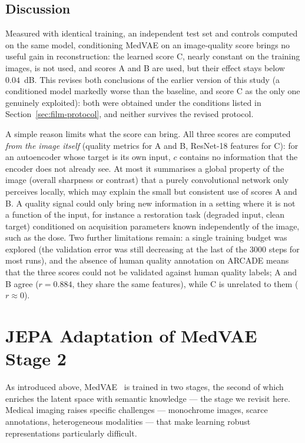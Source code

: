 \documentclass[conference]{IEEEtran}
\begin{document}
\FloatBarrier
\subsection{Discussion}
\label{sec:discussion-theophile}

Measured with identical training, an independent test set and controls
computed on the same model, conditioning MedVAE on an image-quality score
brings no useful gain in reconstruction: the learned score C, nearly
constant on the training images, is not used, and scores A and B are
used, but their effect stays below $0.04$~dB. This revises both
conclusions of the earlier version of this study (a conditioned model
markedly worse than the baseline, and score C as the only one genuinely
exploited): both were obtained under the conditions listed in
Section~\ref{sec:film-protocol}, and neither survives the revised
protocol.

A simple reason limits what the score can bring. All three scores are
computed \emph{from the image itself} (quality metrics for A and B,
ResNet-18 features for C): for an autoencoder whose target is its own
input, $c$ contains no information that the encoder does not already
see. At most it summarises a global property of the image (overall
sharpness or contrast) that a purely convolutional network only
perceives locally, which may explain the small but consistent use of scores A and B.
A quality signal could only bring new information in a setting where it
is not a function of the input, for instance a restoration task
(degraded input, clean target) conditioned on acquisition parameters
known independently of the image, such as the dose. Two further limitations remain: a single
training budget was explored (the validation error was still decreasing
at the last of the 3000 steps for most runs), and the absence of human quality
annotation on ARCADE means that the three scores could not be validated
against human quality labels; A and B agree ($r = 0.884$, they share the
same features), while C is unrelated to them ($r \approx 0$).

\newpage
\section{JEPA Adaptation of MedVAE Stage 2}
\label{sec:jepa}

As introduced above, MedVAE~\cite{varma2025medvaeefficientautomatedinterpretation} is trained in two stages, the second of which enriches the latent space with semantic knowledge --- the stage we revisit here. Medical imaging raises specific challenges --- monochrome images, scarce annotations, heterogeneous modalities --- that make learning robust representations particularly difficult.
\end{document}
